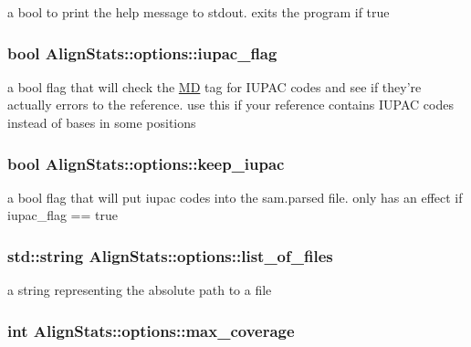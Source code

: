 \label{struct_align_stats_1_1options_ae9a1d04b390a861656a13bbb9becefcc}
a bool to print the help message to stdout. exits the program if true \hypertarget{struct_align_stats_1_1options_aed2b228a0a13d98c5d544a48d4091b09}{
\subsubsection[{iupac\_\-flag}]{\setlength{\rightskip}{0pt plus 5cm}bool {\bf AlignStats::options::iupac\_\-flag}}}
\label{struct_align_stats_1_1options_aed2b228a0a13d98c5d544a48d4091b09}
a bool flag that will check the \hyperlink{class_m_d}{MD} tag for IUPAC codes and see if they're actually errors to the reference. use this if your reference contains IUPAC codes instead of bases in some positions \hypertarget{struct_align_stats_1_1options_a64eb45282d8d26af88352817d84cd94a}{
\subsubsection[{keep\_\-iupac}]{\setlength{\rightskip}{0pt plus 5cm}bool {\bf AlignStats::options::keep\_\-iupac}}}
\label{struct_align_stats_1_1options_a64eb45282d8d26af88352817d84cd94a}
a bool flag that will put iupac codes into the sam.parsed file. only has an effect if iupac\_\-flag == true \hypertarget{struct_align_stats_1_1options_a9e16b499aaad5e645652bbc234dc018f}{
\subsubsection[{list\_\-of\_\-files}]{\setlength{\rightskip}{0pt plus 5cm}std::string {\bf AlignStats::options::list\_\-of\_\-files}}}
\label{struct_align_stats_1_1options_a9e16b499aaad5e645652bbc234dc018f}
a string representing the absolute path to a file \hypertarget{struct_align_stats_1_1options_af7fdf5340fa114c3296fd3f675b48b4f}{
\subsubsection[{max\_\-coverage}]{\setlength{\rightskip}{0pt plus 5cm}int {\bf AlignStats::options::max\_\-coverage}}}
